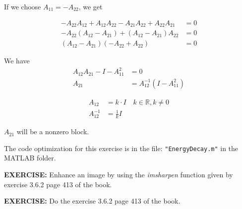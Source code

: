\documentclass[a4paper, 12pt]{article}
\begin{document}
If we choose $A_{11} = -A_{22}$, we get

\begin{align*}
-A_{22}A_{12} + A_{12}A_{22} - A_{21}A_{22} + A_{22}A_{21} &= 0 \\
-A_{22}(A_{12} - A_{21}) + (A_{12} - A_{21})A_{22} &= 0 \\
(A_{12} - A_{21})(-A_{22} + A_{22}) &= 0
\end{align*}

We have
\begin{align*}
A_{12}A_{21} - I - A_{11}^2 &= 0 \\
A_{21} &= A_{12}^{-1}(I - A_{11}^2)
\end{align*}

\begin{align*}
A_{12} &= k \cdot I \quad k \in \mathbb{R}, k \neq 0 \\
A_{12}^{-1} &= \frac{1}{k} I
\end{align*}

$A_{21}$ will be a nonzero block.

The code optimization for this exercise is in the file: \texttt{"EnergyDecay.m"} in the MATLAB folder.

\textbf{EXERCISE:} Enhance an image by using the \textit{imsharpen} function given by exercise 3.6.2 page 413 of the book.

\textbf{EXERCISE:} Do the exercise 3.6.2 page 413 of the book.
\end{document}
